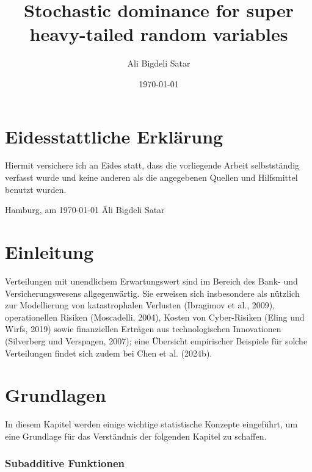 \documentclass[
12pt,
fancyheadings, %
%
a4paper, 
%
]{tuhhreprt}
\author{Ali Bigdeli Satar}
\title{Stochastic dominance for super heavy-tailed random variables}
\date{\today}
\begin{document}
\frontmatter
\maketitle

\chapter*{Eidesstattliche Erklärung}

Hiermit versichere ich an Eides statt, dass die vorliegende Arbeit selbstständig verfasst wurde und keine anderen als die angegebenen Quellen und Hilfsmittel benutzt wurden.

\vspace{2cm}

\begin{tabbing}
Hamburg, am \today \hspace{5cm} \= Ali Bigdeli Satar
\end{tabbing}

\clearpage

\tableofcontents

\listoffigures{}
\mainmatter
\chapter{Einleitung}

Verteilungen mit unendlichem Erwartungswert sind im Bereich des Bank- und Versicherungswesens allgegenwärtig. Sie erweisen sich insbesondere als nützlich zur Modellierung von katastrophalen Verlusten (Ibragimov et al., 2009), operationellen Risiken (Moscadelli, 2004), Kosten von Cyber-Risiken (Eling und Wirfs, 2019) sowie finanziellen Erträgen aus technologischen Innovationen (Silverberg und Verspagen, 2007); eine Übersicht empirischer Beispiele für solche Verteilungen findet sich zudem bei Chen et al. (2024b)\cite{ChenShneer2024}.


\chapter{Grundlagen}

\makeatletter
\renewcommand{\thesubsection}{\thechapter.\arabic{subsection}}
\makeatother
In diesem Kapitel werden einige wichtige statistische Konzepte eingeführt, um eine Grundlage für das Verständnis der folgenden Kapitel zu schaffen.

\subsection{Subadditive Funktionen}
\end{document}

